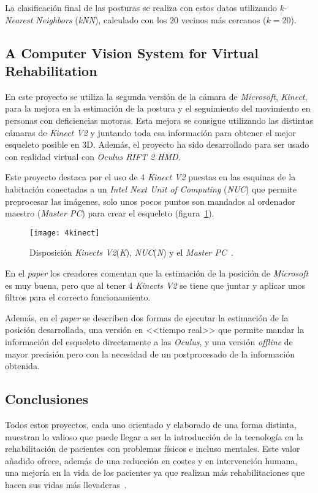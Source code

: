 La clasificación final de las posturas se realiza con estos datos utilizando \textit{k-Nearest Neighbors} (\textit{kNN}), calculado con los 20 vecinos más cercanos ($k=20$).

\subsection{A Computer Vision System for Virtual Rehabilitation~\cite{bonen}}
En este proyecto se utiliza la segunda versión de la cámara de \textit{Microsoft}, \textit{Kinect}, para la mejora en la estimación de la postura y el seguimiento del movimiento en personas con deficiencias motoras. Esta mejora se consigue utilizando las distintas cámaras de \textit{Kinect V2} y juntando toda esa información para obtener el mejor esqueleto posible en 3D. Además, el proyecto ha sido desarrollado para ser usado con realidad virtual con \textit{Oculus RIFT 2 HMD}.

Este proyecto destaca por el uso de 4 \textit{Kinect V2} puestas en las esquinas de la habitación conectadas a un \textit{Intel Next Unit of Computing} (\textit{NUC}) que permite preprocesar las imágenes, solo unos pocos puntos son mandados al ordenador maestro (\textit{Master PC}) para crear el esqueleto (figura~\ref{fig:4kinects}).

\begin{figure}[h]
	\centering
	\texttt{[image: 4kinect]}
	\caption{Disposición \textit{Kinects V2}(\textit{K}), \textit{NUC}(\textit{N}) y el \textit{Master PC}~\cite{bonen}.}
	\label{fig:4kinects}
\end{figure}

En el \textit{paper} los creadores comentan que la estimación de la posición de \textit{Microsoft} es muy buena, pero que al tener 4 \textit{Kinects V2} se tiene que juntar y aplicar unos filtros para el correcto funcionamiento.

Además, en el \textit{paper} se describen dos formas de ejecutar la estimación de la posición desarrollada, una versión en <<tiempo real>> que permite mandar la información del esqueleto directamente a las \textit{Oculus}, y una versión \textit{offline} de mayor precisión pero con la necesidad de un postprocesado de la información obtenida.


\subsection{Conclusiones}
Todos estos proyectos, cada uno orientado y elaborado de una forma distinta, muestran lo valioso que puede llegar a ser la introducción de la tecnología en la rehabilitación de pacientes con problemas físicos e incluso mentales. Este valor añadido ofrece, además de una reducción en costes y en intervención humana, una mejoría en la vida de los pacientes ya que realizan más rehabilitaciones que hacen sus vidas más llevaderas~\cite{motiv}.
